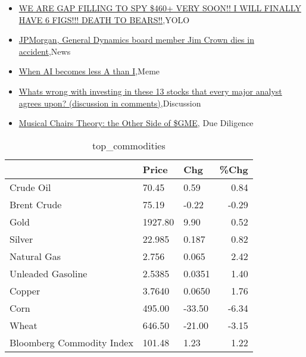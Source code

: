 \documentclass{article}%
\begin{document}
%
\begin{itemize}%
\item%
\href{https://reddit.com/r/wallstreetbets/comments/14nsgpb/we\_are\_gap\_filling\_to\_spy\_460\_very\_soon\_i\_will/}{WE ARE GAP FILLING TO SPY \$460+ VERY SOON!! I WILL FINALLY HAVE 6 FIGS!!! DEATH TO BEARS!!},YOLO%
\item%
\href{https://reddit.com/r/wallstreetbets/comments/14nmma1/jpmorgan\_general\_dynamics\_board\_member\_jim\_crown/}{JPMorgan, General Dynamics board member Jim Crown dies in accident},News%
\item%
\href{https://reddit.com/r/wallstreetbets/comments/14nlxos/when\_ai\_becomes\_less\_a\_than\_i/}{When AI becomes less A than I},Meme%
\item%
\href{https://reddit.com/r/StockMarket/comments/14np1eq/whats\_wrong\_with\_investing\_in\_these\_13\_stocks/}{Whats wrong with investing in these 13 stocks that every major analyst agrees upon? (discussion in comments)},Discussion%
\item%
\href{https://reddit.com/r/Superstonk/comments/14nfhqo/musical\_chairs\_theory\_the\_other\_side\_of\_gme/}{Musical Chairs Theory: the Other Side of \$GME}, Due Diligence%
\end{itemize}%


\begin{table}[htbp]%
\caption{top\_commodities}%
\centering%
\begin{adjustbox}{width=1\textwidth}%
\begin{tabular}{lllr}
\toprule
                          &   Price &    Chg &  \%Chg \\
\midrule
               Crude Oil  &   70.45 &   0.59 &  0.84 \\
             Brent Crude  &   75.19 &  -0.22 & -0.29 \\
                    Gold  & 1927.80 &   9.90 &  0.52 \\
                  Silver  &  22.985 &  0.187 &  0.82 \\
             Natural Gas  &   2.756 &  0.065 &  2.42 \\
       Unleaded Gasoline  &  2.5385 & 0.0351 &  1.40 \\
                  Copper  &  3.7640 & 0.0650 &  1.76 \\
                    Corn  &  495.00 & -33.50 & -6.34 \\
                   Wheat  &  646.50 & -21.00 & -3.15 \\
Bloomberg Commodity Index &  101.48 &   1.23 &  1.22 \\
\bottomrule
\end{tabular}
%
\end{adjustbox}%
\end{table}
\end{document}

